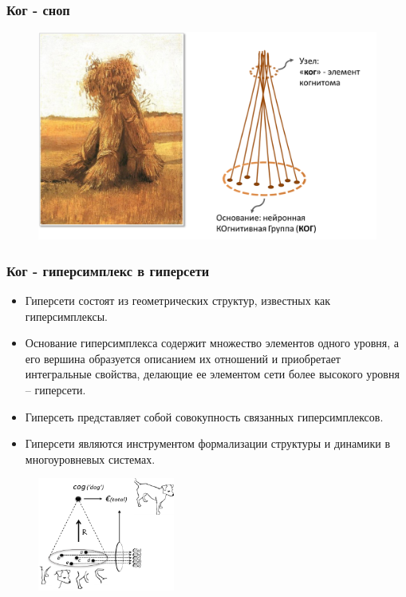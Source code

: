 \documentclass[default]{beamer}
\begin{document}
	\begin{frame}
		\frametitle{Ког - сноп}
		
		\begin{figure}
			\includegraphics[width=\textwidth]{stog}
		\end{figure}
	\end{frame}

	\begin{frame}
		\frametitle{Ког - гиперсимплекс в гиперсети}
		\footnotesize
		\begin{itemize}
			\item Гиперсети состоят из геометрических структур, известных как гиперсимплексы.
			\item Основание гиперсимплекса содержит множество элементов одного уровня, а его вершина образуется описанием их отношений и приобретает интегральные свойства, делающие ее элементом сети более высокого уровня – гиперсети.
			\item Гиперсеть представляет собой совокупность связанных гиперсимплексов. 
			\item Гиперсети являются инструментом формализации структуры и динамики в многоуровневых системах.
		\end{itemize}
		\begin{figure}
			\includegraphics[width=0.4\textwidth]{cog-dog}
		\end{figure}
	\end{frame}	
	
\end{document}

